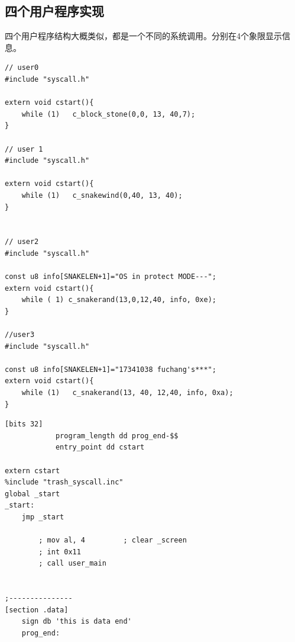 \documentclass[a4paper,11pt,UTF8]{ctexart}
\begin{document}
	\subsection{四个用户程序实现}

	四个用户程序结构大概类似，都是一个不同的系统调用。分别在4个象限显示信息。
	\begin{lstlisting}[language={[ANSI]C},keywordstyle=\color{blue!70},commentstyle=\color{red!50!green!50!blue!50},frame=shadowbox, rulesepcolor=\color{red!20!green!20!blue!20}]
// user0
#include "syscall.h"

extern void cstart(){
	while (1)	c_block_stone(0,0, 13, 40,7);
}

// user 1
#include "syscall.h"

extern void cstart(){
	while (1)	c_snakewind(0,40, 13, 40);
}


// user2 
#include "syscall.h"

const u8 info[SNAKELEN+1]="OS in protect MODE---";
extern void cstart(){
	while ( 1) c_snakerand(13,0,12,40, info, 0xe);
}

//user3
#include "syscall.h"

const u8 info[SNAKELEN+1]="17341038 fuchang's***";
extern void cstart(){
	while (1)	c_snakerand(13, 40, 12,40, info, 0xa);
}
	\end{lstlisting}

	\begin{lstlisting}[language=={[x86masm]Assembler}keywordstyle=\color{blue!70},commentstyle=\color{red!50!green!50!blue!50},frame=shadowbox, rulesepcolor=\color{red!20!green!20!blue!20}]
			[bits 32]
			program_length dd prog_end-$$
			entry_point dd cstart

extern cstart
%include "trash_syscall.inc"
global _start
_start:
	jmp _start

		; mov al, 4			; clear _screen
		; int 0x11
		; call user_main


;---------------
[section .data]
	sign db 'this is data end'
	prog_end:

	\end{lstlisting}
	
\end{document}
